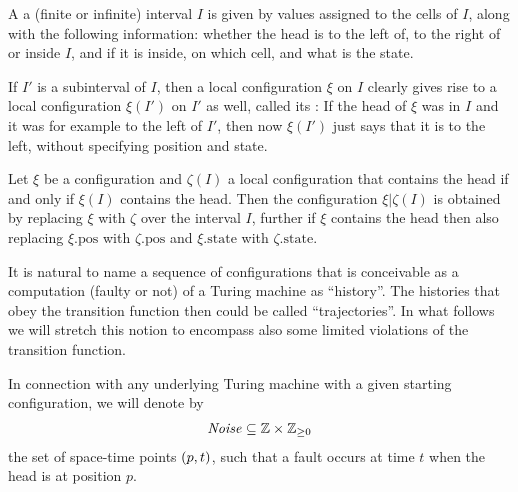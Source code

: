 \documentclass[12pt]{memoir}
\renewcommand{\ge}{\geq}
\newcommand{\Noise}{\mathit{Noise}}
\newcommand{\pos}{\mathrm{pos}}
\newcommand{\state}{\mathrm{state}}
\begin{document}
\begin{definition}
\label{def:local-config}
  A  a (finite or infinite)
  interval \( I \) is given by values assigned to the cells
  of \( I \), along with the following information: whether
  the head is to the left of, to the right of or inside
  \( I \), and if it is inside, on which cell, and what is
  the state.

  If \( I' \) is a subinterval of \( I \), then a local configuration
  \( \xi \) on \( I \) clearly gives rise to a local configuration
  \( \xi(I') \) on \( I' \) as well, called its
  : If the head of \( \xi \) was in \( I \)
  and it was for example to the left of \( I' \), then now
  \( \xi(I') \) just says that it is to the left, without
  specifying position and state.

  Let \( \xi \) be a configuration and \( \zeta(I) \) a local
  configuration that contains the head if and only if
  \( \xi(I) \) contains the head.
  Then the configuration \( \xi\vert\zeta(I) \) is obtained by
  replacing \( \xi \) with \( \zeta \) over the interval \( I \),
  further if \( \xi \) contains the head then also replacing
  \( \xi.\pos \) with \( \zeta.\pos \) and \( \xi.\state \) with
  \( \zeta.\state \).
\end{definition}

It is natural to name a sequence of configurations that is conceivable as a computation
(faulty or not) of a Turing machine as ``history''.
The histories that obey the transition function then could be called ``trajectories''.
In what follows we will 
stretch this notion to encompass also some limited violations of the
transition function.

In connection with any underlying Turing machine with a given starting configuration, we will
denote by
\begin{align}\label{eq:noise-first}
   \Noise\subseteq \bbZ\times \bbZ_{\ge 0}
\end{align}
the set of space-time points \( (p,t) \), such that
a fault occurs at time \( t \) when the head is at position \( p \).
\end{document}
